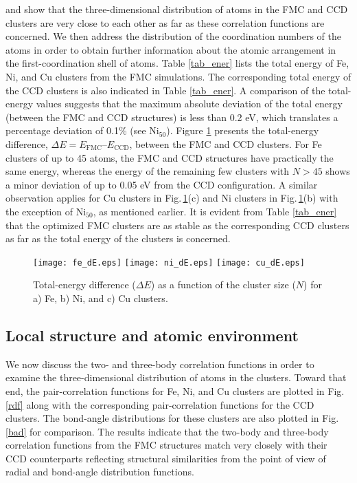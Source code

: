 \documentclass[a4paper]{jpconf}
\begin{document}
%
and show that the three-dimensional 
distribution of atoms in the FMC and CCD clusters are very close to each 
other as far as these correlation functions are concerned. 
We then address the distribution of the coordination numbers of 
the atoms in order to obtain further information about the atomic arrangement in 
the first-coordination shell of atoms. 
Table \ref{tab_ener} lists the total energy of 
Fe, Ni, and Cu clusters from the FMC simulations. The 
corresponding total energy of the CCD clusters is also indicated 
in Table \ref{tab_ener}. A comparison of the total-energy values suggests that the maximum 
absolute deviation of the total energy (between the FMC and CCD structures) 
is less than 0.2 eV, which translates a percentage deviation 
of 0.1\% (see Ni$_{50}$). Figure \ref{ener} presents the 
total-energy difference, 
$\Delta E=E_{\text{FMC}}$--$E_{\text{CCD}}$, between 
the FMC and CCD clusters.  For Fe clusters of 
up to 45 atoms, the FMC and CCD structures have practically
the same energy, whereas the energy of the remaining few 
clusters with $N>45$ shows a minor deviation of up 
to 0.05 eV from the CCD configuration. A similar observation 
applies for Cu clusters in Fig.\,\ref{ener}(c) and Ni 
clusters in Fig.\,\ref{ener}(b) with the exception 
of Ni$_{50}$, as mentioned earlier. 
It is evident from Table \ref{tab_ener} 
that the optimized FMC clusters are as stable as the 
corresponding CCD clusters as far as the total energy 
of the clusters is concerned.


\begin{figure}[ht]
\begin{center}
\texttt{[image: fe\_dE.eps]}\hspace{2mm}
\texttt{[image: ni\_dE.eps]}\hspace{2mm}
\texttt{[image: cu\_dE.eps]}
\caption{\label{ener}
{\small 
Total-energy difference ($\Delta E$) as a function of the 
cluster size ($N$) for a) Fe, b) Ni, and c) Cu clusters. 
}}
\end{center}
\end{figure}

\subsection{Local structure and atomic environment}
We now discuss the two- and three-body correlation functions 
in order to examine the three-dimensional distribution of atoms in the 
clusters. Toward that end, the pair-correlation functions 
for Fe, Ni, and Cu clusters are plotted in Fig.\,\ref{rdf} 
along with the corresponding pair-correlation functions 
for the CCD clusters.  The bond-angle distributions for 
these clusters are also plotted in Fig.\,\ref{bad} for comparison. The results 
indicate that the two-body and three-body correlation 
functions from the FMC structures match very closely with 
their CCD counterparts reflecting structural similarities 
from the point of view of radial and bond-angle distribution 
functions. 
\end{document}
